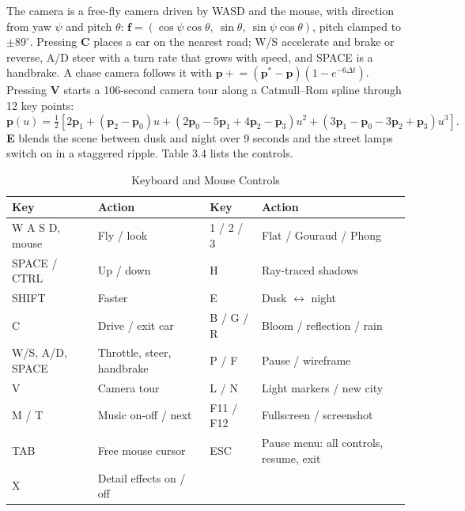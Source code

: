 \documentclass[12pt, a4paper]{report}
\begin{document}
\begin{justify}
  {\fontsize{12}{13.8}\selectfont
    The camera is a free-fly camera driven by WASD and the mouse, with direction from yaw $\psi$ and pitch $\theta$: $\mathbf{f}=(\cos\psi\cos\theta,\ \sin\theta,\ \sin\psi\cos\theta)$, pitch clamped to $\pm89^\circ$. Pressing \textbf{C} places a car on the nearest road; W/S accelerate and brake or reverse, A/D steer with a turn rate that grows with speed, and SPACE is a handbrake. A chase camera follows it with $\mathbf{p}\mathrel{+}=(\mathbf{p}^{*}-\mathbf{p})(1-e^{-6\Delta t})$. Pressing \textbf{V} starts a 106-second camera tour along a Catmull--Rom spline through 12 key points:
    \begin{equation}
      \mathbf{p}(u)=\tfrac12\left[2\mathbf{p}_1+(\mathbf{p}_2-\mathbf{p}_0)u+(2\mathbf{p}_0-5\mathbf{p}_1+4\mathbf{p}_2-\mathbf{p}_3)u^2+(3\mathbf{p}_1-\mathbf{p}_0-3\mathbf{p}_2+\mathbf{p}_3)u^3\right].
    \end{equation}
    \textbf{E} blends the scene between dusk and night over 9 seconds and the street lamps switch on in a staggered ripple. Table 3.4 lists the controls.
  }
\end{justify}

\begin{table}[!htbp]
  \caption{Keyboard and Mouse Controls}
  \label{tab:3.2}
  \centering
  {\fontsize{10}{12.5}\selectfont
    \begin{tabular}{|p{1.15in}|p{1.75in}|p{0.8in}|p{1.6in}|}
      \hline
      \textbf{Key} & \textbf{Action} & \textbf{Key} & \textbf{Action} \\
      \hline
      W A S D, mouse & Fly / look & 1 / 2 / 3 & Flat / Gouraud / Phong \\
      \hline
      SPACE / CTRL & Up / down & H & Ray-traced shadows \\
      \hline
      SHIFT & Faster & E & Dusk $\leftrightarrow$ night \\
      \hline
      C & Drive / exit car & B / G / R & Bloom / reflection / rain \\
      \hline
      W/S, A/D, SPACE & Throttle, steer, handbrake & P / F & Pause / wireframe \\
      \hline
      V & Camera tour & L / N & Light markers / new city \\
      \hline
      M / T & Music on-off / next & F11 / F12 & Fullscreen / screenshot \\
      \hline
      TAB & Free mouse cursor & ESC & Pause menu: all controls, resume, exit \\
      \hline
      X & Detail effects on / off & & \\
      \hline
    \end{tabular}
  }
\end{table}
\end{document}
